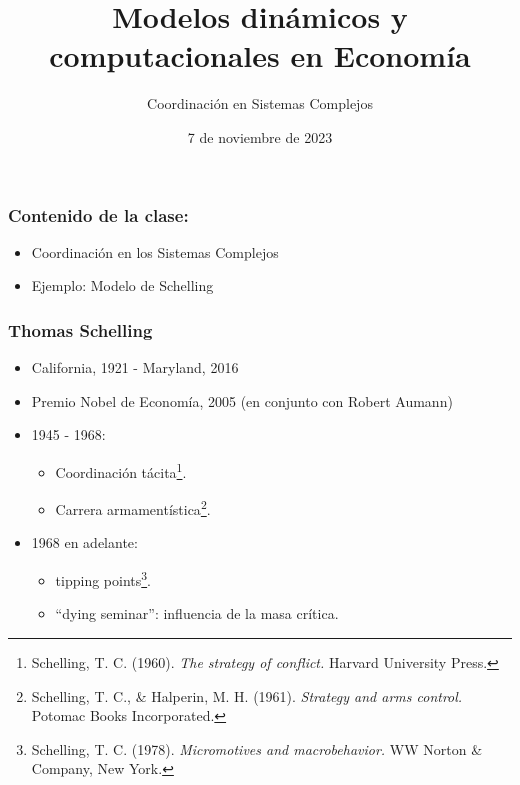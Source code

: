 \documentclass[11pt]{beamer}
\begin{document}
	\title{Modelos dinámicos y computacionales en Economía}
	\subtitle{Coordinación en Sistemas Complejos}
\date{7 de noviembre de 2023}


\begin{frame}
\frametitle{Contenido de la clase:}
\begin{itemize}
	\item Coordinación en los Sistemas Complejos
	\item Ejemplo: Modelo de Schelling
\end{itemize}
\end{frame}

\begin{frame}
	\frametitle{Thomas Schelling}
\begin{itemize}
	\item California, 1921 - Maryland, 2016
	\item Premio Nobel de Economía, 2005 (en conjunto con Robert Aumann)
	\item 1945 - 1968:
	\begin{itemize}
		\item Coordinación tácita\footnote{Schelling, T. C. (1960). \textit{The strategy of conflict.} Harvard University Press.}.
		\item Carrera armamentística\footnote{Schelling, T. C., \& Halperin, M. H. (1961). \textit{Strategy and arms control.} Potomac Books Incorporated.}.
	\end{itemize} 
\item 1968 en adelante:
\begin{itemize}
	\item tipping points\footnote{Schelling, T. C. (1978). \textit{Micromotives and macrobehavior.} WW Norton \& Company, New York.}.
	\item ``dying seminar'': influencia de la masa crítica.
\end{itemize}
\end{itemize}	
\end{frame}
\end{document}
